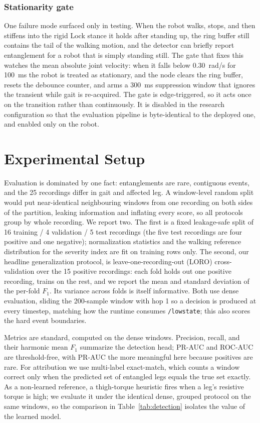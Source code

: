 \documentclass[conference]{IEEEtran}
\begin{document}
\subsubsection{Stationarity gate}
One failure mode surfaced only in testing. When the robot walks, stops, and then stiffens into the
rigid Lock stance it holds after standing up, the ring buffer still contains the tail of the walking
motion, and the detector can briefly report entanglement for a robot that is simply standing still.
The gate that fixes this watches the mean absolute joint velocity: when it falls below 0.30~rad/s for
100~ms the robot is treated as stationary, and the node clears the ring buffer, resets the debounce
counter, and arms a 300~ms suppression window that ignores the transient while gait is re-acquired.
The gate is edge-triggered, so it acts once on the transition rather than continuously. It is disabled
in the research configuration so that the evaluation pipeline is byte-identical to the deployed one,
and enabled only on the robot.

\section{Experimental Setup}

Evaluation is dominated by one fact: entanglements are rare, contiguous events, and the 25 recordings differ in gait and affected leg. A window-level random split would put near-identical neighbouring windows from one recording on both sides of the partition, leaking information and inflating every score, so all protocols group by whole recording. We report two. The first is a fixed leakage-safe split of 16 training / 4 validation / 5 test recordings (the five test recordings are four positive and one negative); normalization statistics and the walking reference distribution for the severity index are fit on training rows only. The second, our headline generalization protocol, is leave-one-recording-out (LORO) cross-validation over the 15 positive recordings: each fold holds out one positive recording, trains on the rest, and we report the mean and standard deviation of the per-fold $F_1$. Its variance across folds is itself informative. Both use dense evaluation, sliding the 200-sample window with hop 1 so a decision is produced at every timestep, matching how the runtime consumes \texttt{/lowstate}; this also scores the hard event boundaries.

Metrics are standard, computed on the dense windows. Precision, recall, and their harmonic mean $F_1$ summarize the detection head; PR-AUC and ROC-AUC are threshold-free, with PR-AUC the more meaningful here because positives are rare. For attribution we use multi-label exact-match, which counts a window correct only when the predicted set of entangled legs equals the true set exactly. As a non-learned reference, a thigh-torque heuristic fires when a leg's resistive torque is high; we evaluate it under the identical dense, grouped protocol on the same windows, so the comparison in Table~\ref{tab:detection} isolates the value of the learned model.
\end{document}

